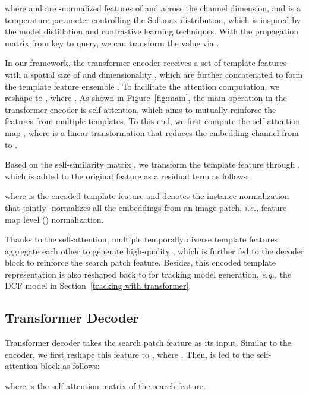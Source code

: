 \documentclass[10pt,twocolumn,letterpaper]{article}
\begin{document}
where  and  are -normalized features of  and  across the channel dimension, and  is a temperature parameter controlling the Softmax distribution, which is inspired by the model distillation \cite{hinton2015distilling} and contrastive learning \cite{SimCLR} techniques.
With the propagation matrix  from key to query, we can transform the value via .



In our framework, the transformer encoder receives a set of template features  with a spatial size of  and dimensionality , which are further concatenated to form the template feature ensemble .
To facilitate the attention computation, we reshape  to , where .
As shown in Figure~\ref{fig:main}, the main operation in the transformer encoder is self-attention, which aims to mutually reinforce the features from multiple templates.
To this end, we first compute the self-attention map ,  where  is a  linear transformation that reduces the embedding channel from  to . 




Based on the self-similarity matrix , we transform the template feature through , which is added to the original feature  as a residual term as follows:

where  is the encoded template feature and  denotes the instance normalization that jointly -normalizes all the embeddings from an image patch, \emph{i.e.,} feature map level () normalization.



Thanks to the self-attention, multiple temporally diverse template features aggregate each other to generate high-quality , which is further fed to the decoder block to reinforce the search patch feature.
Besides, this encoded template representation  is also reshaped back to  for tracking model generation, \emph{e.g.,} the DCF model in Section~\ref{tracking with transformer}.



\subsection{Transformer Decoder}\label{decoder}


Transformer decoder takes the search patch feature  as its input. 
Similar to the encoder, we first reshape this feature to , where . Then,  is fed to the self-attention block as follows:

where  is the self-attention matrix of the search feature.
\end{document}
